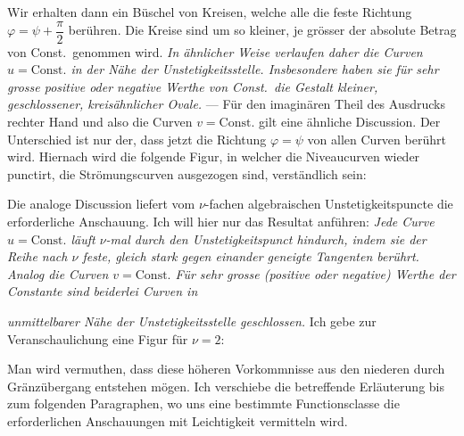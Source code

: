\documentclass{article}
\begin{document}
Wir erhalten dann ein Büschel von Kreisen, welche alle die feste Richtung $\varphi = \psi + \dfrac{\pi}{2}$ berühren. Die Kreise sind um so kleiner, je grösser der absolute Betrag von Const.\ genommen wird. \emph{In ähnlicher Weise verlaufen daher die Curven $u = \text{Const.}$ in der Nähe der Unstetigkeitsstelle. Insbesondere haben sie für sehr grosse positive oder negative Werthe von Const.\ die Gestalt kleiner, geschlossener, kreisähnlicher Ovale.} --- Für den imaginären Theil des Ausdrucks rechter Hand und also die Curven $v = \text{Const.}$ gilt eine ähnliche Discussion. Der Unterschied ist nur der, dass jetzt die Richtung $\varphi = \psi$ von allen Curven berührt wird. Hiernach wird die folgende Figur, in welcher die Niveaucurven wieder punctirt, die Strömungscurven ausgezogen sind, verständlich sein:


Die analoge Discussion liefert vom $\nu$-fachen algebraischen Unstetigkeitspuncte die erforderliche Anschauung. Ich will hier nur das Resultat anführen: \emph{Jede Curve $u = \text{Const.}$ läuft $\nu$-mal durch den Unstetigkeitspunct hindurch, indem sie der Reihe nach $\nu$ feste, gleich stark gegen einander geneigte Tangenten berührt. Analog die Curven $v = \text{Const.}$ Für sehr grosse (positive oder negative) Werthe der Constante sind beiderlei Curven in}

\emph{unmittelbarer Nähe der Unstetigkeitsstelle geschlossen.} Ich gebe zur Veranschaulichung eine Figur für $\nu = 2$:


Man wird vermuthen, dass diese höheren Vorkommnisse aus den niederen durch Gränzübergang entstehen mögen. Ich verschiebe die betreffende Erläuterung bis zum folgenden Paragraphen, wo uns eine bestimmte Functionsclasse die erforderlichen Anschauungen mit Leichtigkeit vermitteln wird.
\end{document}
